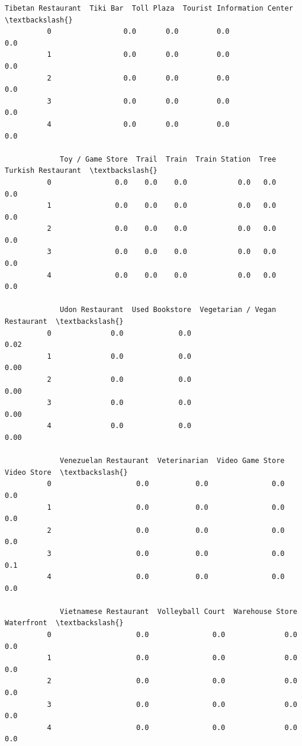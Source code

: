 \documentclass[11pt]{article}
\begin{document}
\begin{Verbatim}[commandchars=\\\{\}]
             Tibetan Restaurant  Tiki Bar  Toll Plaza  Tourist Information Center  \textbackslash{}
          0                 0.0       0.0         0.0                         0.0   
          1                 0.0       0.0         0.0                         0.0   
          2                 0.0       0.0         0.0                         0.0   
          3                 0.0       0.0         0.0                         0.0   
          4                 0.0       0.0         0.0                         0.0   
          
             Toy / Game Store  Trail  Train  Train Station  Tree  Turkish Restaurant  \textbackslash{}
          0               0.0    0.0    0.0            0.0   0.0                 0.0   
          1               0.0    0.0    0.0            0.0   0.0                 0.0   
          2               0.0    0.0    0.0            0.0   0.0                 0.0   
          3               0.0    0.0    0.0            0.0   0.0                 0.0   
          4               0.0    0.0    0.0            0.0   0.0                 0.0   
          
             Udon Restaurant  Used Bookstore  Vegetarian / Vegan Restaurant  \textbackslash{}
          0              0.0             0.0                           0.02   
          1              0.0             0.0                           0.00   
          2              0.0             0.0                           0.00   
          3              0.0             0.0                           0.00   
          4              0.0             0.0                           0.00   
          
             Venezuelan Restaurant  Veterinarian  Video Game Store  Video Store  \textbackslash{}
          0                    0.0           0.0               0.0          0.0   
          1                    0.0           0.0               0.0          0.0   
          2                    0.0           0.0               0.0          0.0   
          3                    0.0           0.0               0.0          0.1   
          4                    0.0           0.0               0.0          0.0   
          
             Vietnamese Restaurant  Volleyball Court  Warehouse Store  Waterfront  \textbackslash{}
          0                    0.0               0.0              0.0         0.0   
          1                    0.0               0.0              0.0         0.0   
          2                    0.0               0.0              0.0         0.0   
          3                    0.0               0.0              0.0         0.0   
          4                    0.0               0.0              0.0         0.0   
          

\end{Verbatim}
\end{document}
